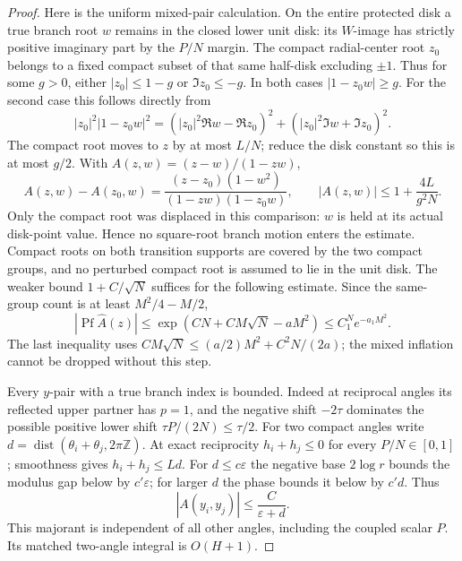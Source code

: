 \documentclass[11pt]{article}
\numberwithin{equation}{section}
\theoremstyle{definition}
\newcommand{\Z}{\mathbb Z}
\newcommand{\eps}{\varepsilon}
\newcommand{\Pf}{\operatorname{Pf}}
\newcommand{\dist}{\operatorname{dist}}
\begin{document}
\begin{proof}
Here is the uniform mixed-pair calculation. On the entire protected
disk a true branch root \(w\) remains in the closed lower unit disk:
its \(W\)-image has strictly positive imaginary part by the
\(P/N\) margin. The compact radial-center root \(z_0\) belongs to
a fixed compact subset of that same half-disk excluding \(\pm1\).
Thus for some \(g>0\), either \(|z_0|\le1-g\) or
\(\Im z_0\le-g\). In both cases \(|1-z_0w|\ge g\).
For the second case this follows directly from
\[
 |z_0|^2|1-z_0w|^2
 =(|z_0|^2\Re w-\Re z_0)^2+
   (|z_0|^2\Im w+\Im z_0)^2.
\]
The compact root moves to \(z\) by at most \(L/N\); reduce the
disk constant so this is at most \(g/2\). With
\(A(z,w)=(z-w)/(1-zw)\),
\[
 A(z,w)-A(z_0,w)=\frac{(z-z_0)(1-w^2)}{(1-zw)(1-z_0w)},\qquad
 |A(z,w)|\le1+\frac{4L}{g^2N}.
\]
Only the compact root was displaced in this comparison: \(w\)
is held at its actual disk-point value. Hence no square-root branch
motion enters the estimate. Compact roots on both transition supports
are covered by the two compact groups, and no perturbed compact root
is assumed to lie in the unit disk. The weaker bound
\(1+C/\sqrt N\) suffices for the following estimate.
Since the same-group count is at least \(M^2/4-M/2\),
\[
 |\Pf\widehat A(z)|\le
 \exp(CN+CM\sqrt N-aM^2)\le C_1^N e^{-a_1M^2}.
\]
The last inequality uses
\(CM\sqrt N\le(a/2)M^2+C^2N/(2a)\); the mixed inflation cannot be
dropped without this step.

Every \(y\)-pair with a true branch index is bounded. Indeed at
reciprocal angles its reflected upper partner has \(p=1\), and
the negative shift \(-2\tau\) dominates the possible positive
lower shift \(\tau P/(2N)\le\tau/2\).
For two compact angles write
\(d=\dist(\theta_i+\theta_j,2\pi\Z)\).
At exact reciprocity \(h_i+h_j\le0\) for every \(P/N\in[0,1]\);
smoothness gives \(h_i+h_j\le Ld\).
For \(d\le c\eps\) the negative base \(2\log r\) bounds the
modulus gap below by \(c'\eps\); for larger \(d\) the phase
bounds it below by \(c'd\). Thus
\[
 |A(y_i,y_j)|\le\frac C{\eps+d}.
\]
This majorant is independent of all other angles, including the
coupled scalar \(P\). Its matched two-angle integral is \(O(H+1)\).


\end{proof}
\end{document}
